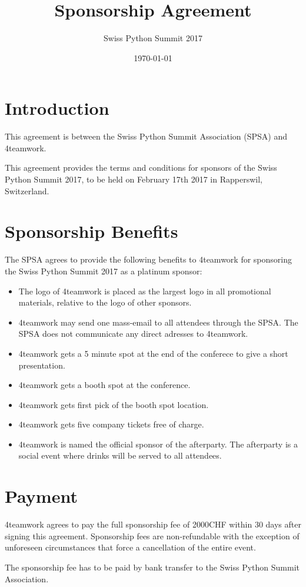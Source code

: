 \documentclass[11pt,enlargefirstpage=true,headlines=4]{scrartcl}
\title{Sponsorship Agreement}
\subtitle{Swiss Python Summit 2017}
\date{\today} %
\begin{document}
    \maketitle

    \section{Introduction}

    This agreement is between the Swiss Python Summit Association (SPSA) and
    4teamwork.

    This agreement provides the terms and conditions for sponsors of the Swiss
    Python Summit 2017, to be held on February 17th 2017 in Rapperswil,
    Switzerland.

    \section{Sponsorship Benefits}

    The SPSA agrees to provide the following benefits to 4teamwork for sponsoring
    the Swiss Python Summit 2017 as a platinum sponsor:

    \begin{itemize}
        \item The logo of 4teamwork is placed as the largest logo in all promotional materials, relative to the logo of other sponsors.
        \item 4teamwork may send one mass-email to all attendees through the SPSA. The SPSA does not communicate any direct adresses to 4teamwork.
        \item 4teamwork gets a 5 minute spot at the end of the conferece to give a short presentation.
        \item 4teamwork gets a booth spot at the conference.
        \item 4teamwork gets first pick of the booth spot location.
        \item 4teamwork gets five company tickets free of charge.
        \item 4teamwork is named the official sponsor of the afterparty. The afterparty is a social event where drinks will be served to all attendees.
    \end{itemize}

    \section{Payment}

    4teamwork agrees to pay the full sponsorship fee of 2000CHF within 30 days
    after signing this agreement. Sponsorship fees are non‐refundable with the
    exception of unforeseen circumstances that force a cancellation of the entire
    event.

    The sponsorship fee has to be paid by bank transfer to the Swiss Python
    Summit Association.

    \quad
\end{document}
